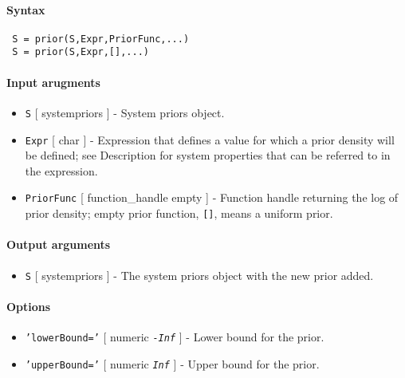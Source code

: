 


	\paragraph{Syntax}
 
 \begin{verbatim}
 S = prior(S,Expr,PriorFunc,...)
 S = prior(S,Expr,[],...)
 \end{verbatim}
 
 \paragraph{Input arugments}
 
 \begin{itemize}
 \item
   \texttt{S} {[} systempriors {]} - System priors object.
 \item
   \texttt{Expr} {[} char {]} - Expression that defines a value for which
   a prior density will be defined; see Description for system properties
   that can be referred to in the expression.
 \item
   \texttt{PriorFunc} {[} function\_handle \textbar{} empty {]} -
   Function handle returning the log of prior density; empty prior
   function, \texttt{{[}{]}}, means a uniform prior.
 \end{itemize}
 
 \paragraph{Output arguments}
 
 \begin{itemize}
 \item
   \texttt{S} {[} systempriors {]} - The system priors object with the
   new prior added.
 \end{itemize}
 
 \paragraph{Options}
 
 \begin{itemize}
 \item
   \texttt{'lowerBound='} {[} numeric \textbar{} \emph{\texttt{-Inf}} {]}
   - Lower bound for the prior.
 \item
   \texttt{'upperBound='} {[} numeric \textbar{} \emph{\texttt{Inf}} {]}
   - Upper bound for the prior.
 \end{itemize}
 
